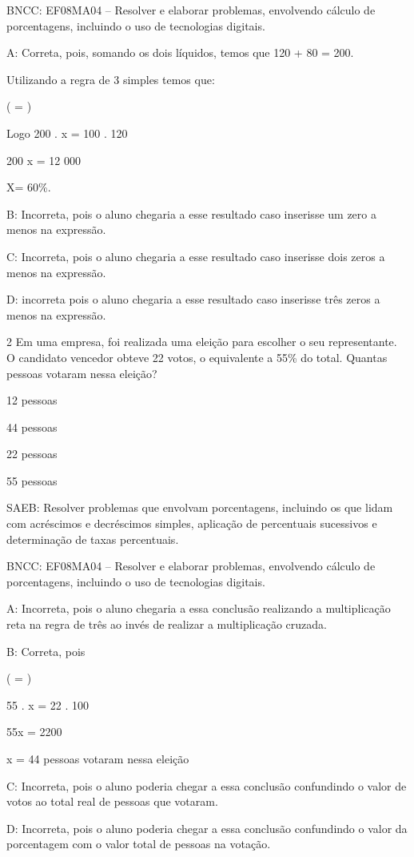 {BNCC: EF08MA04 -- Resolver e elaborar problemas, envolvendo cálculo de
porcentagens, incluindo o uso de tecnologias digitais.

A: Correta, pois, somando os dois líquidos, temos que 120 + 80 = 200.

Utilizando a regra de 3 simples temos que:

( = )

Logo 200 . x = 100 . 120

200 x = 12 000

X= 60\%.

B: Incorreta, pois o aluno chegaria a esse resultado caso inserisse um
zero a menos na expressão.

C: Incorreta, pois o aluno chegaria a esse resultado caso inserisse dois
zeros a menos na expressão.

D: incorreta pois o aluno chegaria a esse resultado caso inserisse três
zeros a menos na expressão.

\num{2} Em uma empresa, foi realizada uma eleição para escolher o seu
representante. O candidato vencedor obteve 22 votos, o equivalente a
55\% do total. Quantas pessoas votaram nessa eleição?
\item 12 pessoas
\item 44 pessoas
\item 22 pessoas
\item 55 pessoas

SAEB: Resolver problemas que envolvam porcentagens, incluindo os que
lidam com acréscimos e decréscimos simples, aplicação de percentuais
sucessivos e determinação de taxas percentuais.

BNCC: EF08MA04 -- Resolver e elaborar problemas, envolvendo cálculo de
porcentagens, incluindo o uso de tecnologias digitais.

A: Incorreta, pois o aluno chegaria a essa conclusão realizando a
multiplicação reta na regra de três ao invés de realizar a multiplicação
cruzada.

B: Correta, pois

( = )

55 . x = 22 . 100

55x = 2200

x = 44 pessoas votaram nessa eleição

C: Incorreta, pois o aluno poderia chegar a essa conclusão confundindo o
valor de votos ao total real de pessoas que votaram.

D: Incorreta, pois o aluno poderia chegar a essa conclusão confundindo o
valor da porcentagem com o valor total de pessoas na votação.

}
